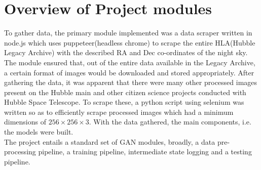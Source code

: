 \documentclass[oneside,a4paper,12pt]{report}
\begin{document}
\section{Overview of Project modules}
\hspace{0.25 in}To gather data, the primary module implemented was a data scraper written in node.js which uses puppeteer(headless chrome) to scrape the entire HLA(Hubble Legacy Archive) with the described RA and Dec co-ordinates of the night sky. The module ensured that, out of the entire data available in the Legacy Archive, a certain format of images would be downloaded and stored appropriately. After gathering the data, it was apparent that there were many other processed images present on the Hubble main and other citizen science projects conducted with Hubble Space Telescope. To scrape these, a python script using selenium was written so as to efficiently scrape processed images which had a minimum dimensions of $256 \times 256 \times 3$. With the data gathered, the main components, i.e. the models were built.\\
\hspace*{0.25 in}The project entails a standard set of GAN modules, broadly, a data pre-processing pipeline, a training pipeline, intermediate state logging and a testing pipeline.
\end{document}
